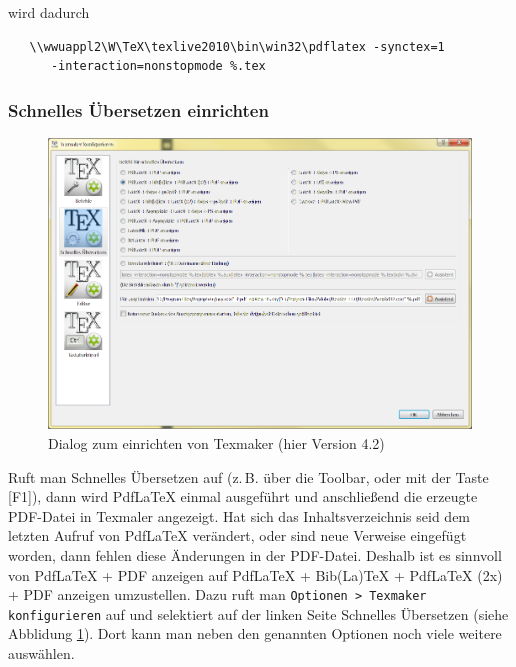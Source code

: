 wird dadurch

\begin{verbatim}
   \\wwuappl2\W\TeX\texlive2010\bin\win32\pdflatex -synctex=1
      -interaction=nonstopmode %.tex
\end{verbatim}

\subsubsection{Schnelles Übersetzen einrichten}

\begin{figure}[bh]
\includegraphics[width=\textwidth]{Bilder/Texmaker_konfigurieren2.png} 
\caption{Dialog zum einrichten von Texmaker (hier Version 4.2)}
\label{texmaker_konf2}
\end{figure}

Ruft man Schnelles Übersetzen auf (z.\,B. über die Toolbar, oder mit der Taste [F1]), dann wird PdfLaTeX einmal ausgeführt und anschließend die erzeugte PDF-Datei in Texmaler angezeigt. Hat sich das Inhaltsverzeichnis seid dem letzten Aufruf von PdfLaTeX verändert, oder sind neue Verweise eingefügt worden, dann fehlen diese Änderungen in der PDF-Datei. Deshalb ist es sinnvoll von  PdfLaTeX + PDF anzeigen auf PdfLaTeX + Bib(La)TeX + PdfLaTeX (2x) + PDF anzeigen umzustellen. Dazu ruft man \verb+Optionen > Texmaker konfigurieren+ auf und selektiert auf der linken Seite Schnelles Übersetzen (siehe Abblidung \ref{texmaker_konf2}). Dort kann man neben den genannten Optionen noch viele weitere auswählen.